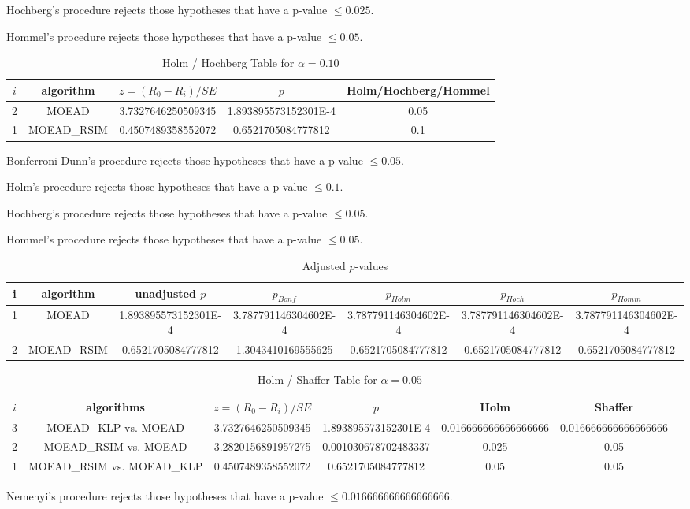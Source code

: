\documentclass[a4paper,10pt]{article}
\begin{document}
\begin{landscape}
Hochberg's procedure rejects those hypotheses that have a p-value $\le0.025$.


Hommel's procedure rejects those hypotheses that have a p-value $\le0.05$.


\begin{table}[!htp]
\centering\tiny
\caption{Holm / Hochberg Table for $\alpha=0.10$}
\begin{tabular}{ccccc}
$i$&algorithm&$z=(R_0 - R_i)/SE$&$p$&Holm/Hochberg/Hommel\\
\hline
2&MOEAD&3.7327646250509345&1.893895573152301E-4&0.05\\
1&MOEAD_RSIM&0.4507489358552072&0.6521705084777812&0.1\\
\hline
\end{tabular}
\end{table}
Bonferroni-Dunn's procedure rejects those hypotheses that have a p-value $\le0.05$.


Holm's procedure rejects those hypotheses that have a p-value $\le0.1$.


Hochberg's procedure rejects those hypotheses that have a p-value $\le0.05$.


Hommel's procedure rejects those hypotheses that have a p-value $\le0.05$.


\begin{table}[!htp]
\centering\tiny
\caption{Adjusted $p$-values}
\begin{tabular}{ccccccc}
i&algorithm&unadjusted $p$&$p_{Bonf}$&$p_{Holm}$&$p_{Hoch}$&$p_{Homm}$\\
\hline
1&MOEAD&1.893895573152301E-4&3.787791146304602E-4&3.787791146304602E-4&3.787791146304602E-4&3.787791146304602E-4\\
2&MOEAD_RSIM&0.6521705084777812&1.3043410169555625&0.6521705084777812&0.6521705084777812&0.6521705084777812\\
\hline
\end{tabular}
\end{table}

\begin{table}[!htp]
\centering\tiny
\caption{Holm / Shaffer Table for $\alpha=0.05$}
\begin{tabular}{cccccc}
$i$&algorithms&$z=(R_0 - R_i)/SE$&$p$&Holm&Shaffer\\
\hline
3&MOEAD_KLP vs. MOEAD&3.7327646250509345&1.893895573152301E-4&0.016666666666666666&0.016666666666666666\\
2&MOEAD_RSIM vs. MOEAD&3.2820156891957275&0.001030678702483337&0.025&0.05\\
1&MOEAD_RSIM vs. MOEAD_KLP&0.4507489358552072&0.6521705084777812&0.05&0.05\\
\hline
\end{tabular}
\end{table}
Nemenyi's procedure rejects those hypotheses that have a p-value $\le0.016666666666666666$.



\end{landscape}
\end{document}
